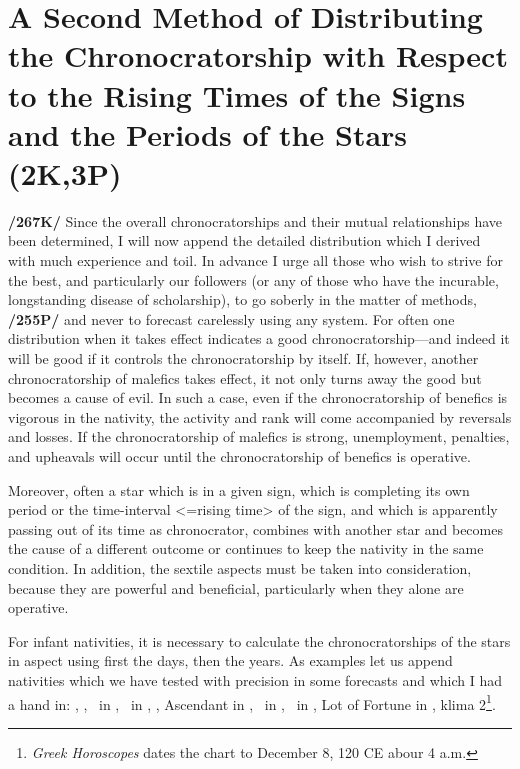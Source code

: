 \section{A Second Method of Distributing the Chronocratorship with Respect to the Rising Times of the Signs and the Periods of the Stars (2K,3P)}
\textbf{/267K/} Since the overall chronocratorships and their mutual relationships have been determined, I will now append the detailed distribution which I derived with much experience and toil. In advance I urge all those who wish to strive for the best, and particularly our followers (or any of those who have the incurable, longstanding
disease of scholarship), to go soberly in the matter of methods, \textbf{/255P/} and never to forecast carelessly using any system. For often one distribution when it takes effect indicates a good chronocratorship—and indeed it will be good if it controls the chronocratorship by itself. If, however, another chronocratorship of malefics takes effect, it not only turns away the good but becomes a cause of evil. In such a case, even if the chronocratorship of benefics is vigorous in the nativity, the activity and rank will come accompanied by reversals and losses. If the chronocratorship of malefics is strong,
unemployment, penalties, and upheavals will occur until the chronocratorship of benefics is operative.

Moreover, often a star which is in a given sign, which is completing its own period or the time-interval <=rising time> of the sign, and which is apparently passing out of its time as chronocrator, combines with another star and becomes the cause of a different outcome or continues to keep the nativity in the same condition. In addition, the sextile aspects must be taken into consideration, because they are powerful and beneficial, particularly when they alone are operative. 

For infant nativities, it is necessary to calculate the chronocratorships of the stars in aspect using first the days, then the years. As examples let us append nativities which we have tested with precision in some forecasts and which I had a hand in: \Sun, \Moon, \Mercury\, in \Sagittarius, \Saturn\, in \Cancer, \Jupiter, Ascendant in \Scorpio, \Mars\, in \Capricorn, \Venus\, in \Aquarius, Lot of Fortune in \Scorpio, klima 2\footnote{\textit{Greek Horoscopes} dates the chart to December 8, 120 CE abour 4 a.m.}. 

